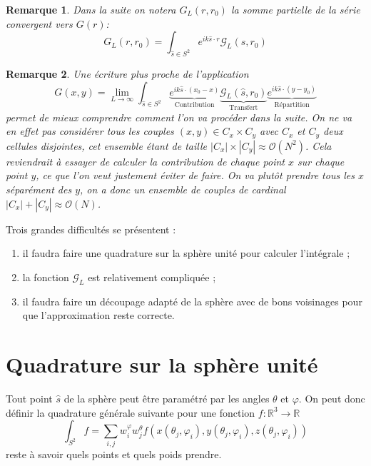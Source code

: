 \documentclass[11pt]{article}
\newtheorem{rmq}{Remarque}
\newcommand{\R}{\mathbb{R}}
\newcommand{\hs}{\hat{s}}
\newcommand{\lG}{\mathcal{G}}
\begin{document}
\begin{rmq}
  Dans la suite on notera $G_L(r, r_0)$ la somme partielle de la série convergent vers $G(r)$:
  \[
    G_L(r, r_0) = \int_{\hs\in S^2} e^{ik \hs \cdot r} \lG_L(\hs, r_0)
  \]
\end{rmq}

\begin{rmq}
  Une écriture plus proche de l'application
  \[
    G(x, y) = \lim_{L\to\infty} \int_{\hs\in S^2}
    \underbrace{e^{ik \hs \cdot (x_0-x)}}_{\text{Contribution}}
    \underbrace{\lG_L(\hs, r_0)}_{\text{Transfert}}
    \underbrace{e^{ik \hs \cdot (y-y_0)}}_{\text{Répartition}}
  \]
  permet de mieux comprendre comment l'on va procéder dans la suite. On ne va en effet pas considérer tous les couples $(x,y) \in C_x \times C_y$
  avec $C_x$ et $C_y$ deux cellules disjointes, cet ensemble étant de taille $|C_x| \times |C_y| \approx \mathcal{O}(N^2)$. Cela reviendrait à essayer de calculer la
  contribution de chaque point $x$ sur chaque point $y$, ce que l'on veut justement éviter de faire. On va plutôt prendre tous les $x$ séparément
  des $y$, on a donc un ensemble de couples de cardinal $|C_x| + |C_y| \approx \mathcal{O}(N)$.
\end{rmq}

Trois grandes difficultés se présentent :
\begin{enumerate}
\item il faudra faire une quadrature sur la sphère unité pour calculer l'intégrale ;
\item la fonction $\lG_L$ est relativement compliquée ;
\item il faudra faire un découpage adapté de la sphère avec de bons voisinages pour que l'approximation reste correcte.
\end{enumerate}

\section{Quadrature sur la sphère unité}

Tout point $\hs$ de la sphère peut être paramétré par les angles $\theta$ et $\varphi$. On peut donc définir la quadrature générale suivante
pour une fonction $f : \R^3 \to \R$
\[
  \int_{S^2} f = \sum_{i, j} w^\varphi_i w^\theta_j f(x(\theta_j, \varphi_i), y(\theta_j, \varphi_i), z(\theta_j, \varphi_i))
\]
reste à savoir quels points et quels poids prendre.
\end{document}
